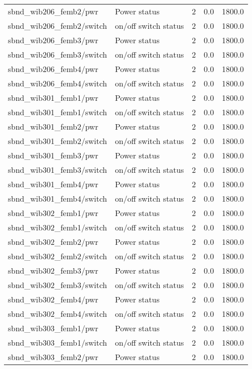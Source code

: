 \begin{center}
\begin{longtable}{l | l l l l }
sbnd\_wib206\_femb2/pwr & Power status & 2 & 0.0 & 1800.0\\ 
sbnd\_wib206\_femb2/switch & on/off switch status & 2 & 0.0 & 1800.0\\ 
sbnd\_wib206\_femb3/pwr & Power status & 2 & 0.0 & 1800.0\\ 
sbnd\_wib206\_femb3/switch & on/off switch status & 2 & 0.0 & 1800.0\\ 
sbnd\_wib206\_femb4/pwr & Power status & 2 & 0.0 & 1800.0\\ 
sbnd\_wib206\_femb4/switch & on/off switch status & 2 & 0.0 & 1800.0\\ 
sbnd\_wib301\_femb1/pwr & Power status & 2 & 0.0 & 1800.0\\ 
sbnd\_wib301\_femb1/switch & on/off switch status & 2 & 0.0 & 1800.0\\ 
sbnd\_wib301\_femb2/pwr & Power status & 2 & 0.0 & 1800.0\\ 
sbnd\_wib301\_femb2/switch & on/off switch status & 2 & 0.0 & 1800.0\\ 
sbnd\_wib301\_femb3/pwr & Power status & 2 & 0.0 & 1800.0\\ 
sbnd\_wib301\_femb3/switch & on/off switch status & 2 & 0.0 & 1800.0\\ 
sbnd\_wib301\_femb4/pwr & Power status & 2 & 0.0 & 1800.0\\ 
sbnd\_wib301\_femb4/switch & on/off switch status & 2 & 0.0 & 1800.0\\ 
sbnd\_wib302\_femb1/pwr & Power status & 2 & 0.0 & 1800.0\\ 
sbnd\_wib302\_femb1/switch & on/off switch status & 2 & 0.0 & 1800.0\\ 
sbnd\_wib302\_femb2/pwr & Power status & 2 & 0.0 & 1800.0\\ 
sbnd\_wib302\_femb2/switch & on/off switch status & 2 & 0.0 & 1800.0\\ 
sbnd\_wib302\_femb3/pwr & Power status & 2 & 0.0 & 1800.0\\ 
sbnd\_wib302\_femb3/switch & on/off switch status & 2 & 0.0 & 1800.0\\ 
sbnd\_wib302\_femb4/pwr & Power status & 2 & 0.0 & 1800.0\\ 
sbnd\_wib302\_femb4/switch & on/off switch status & 2 & 0.0 & 1800.0\\ 
sbnd\_wib303\_femb1/pwr & Power status & 2 & 0.0 & 1800.0\\ 
sbnd\_wib303\_femb1/switch & on/off switch status & 2 & 0.0 & 1800.0\\ 
sbnd\_wib303\_femb2/pwr & Power status & 2 & 0.0 & 1800.0\\ 

\end{longtable}
\end{center}
